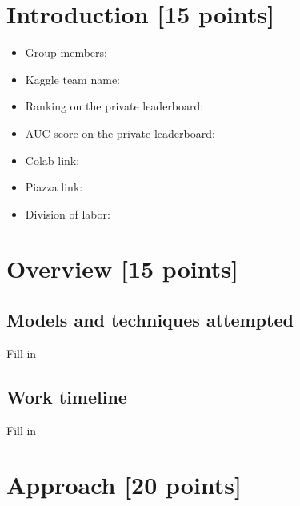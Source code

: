 \newif\ifshowsolutions
\showsolutionstrue







\pagestyle{fancy}




\newpage

\section{Introduction [15 points]}
    \begin{itemize}
        \item Group members:
        \item Kaggle team name:
        \item Ranking on the private leaderboard:
        \item AUC score on the private leaderboard:
        \item Colab link:
        \item Piazza link:
        \item Division of labor:
    \end{itemize} 
\newpage

\section{Overview [15 points]}
\subsection{Models and techniques attempted}
Fill in

\subsection{Work timeline}
Fill in

\newpage

\section{Approach [20 points]}
